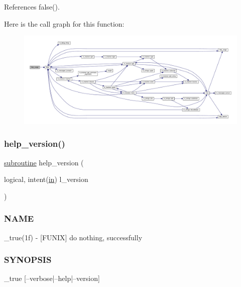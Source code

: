 References false().

Here is the call graph for this function\+:
\nopagebreak
\begin{figure}[H]
\begin{center}
\leavevmode
\includegraphics[width=350pt]{__true_8f90_a3e09a3b52ee8fb04eeb93fe5761626a8_cgraph}
\end{center}
\end{figure}
\mbox{\label{__true_8f90_a39c21619b08a3c22f19e2306efd7f766}} 
\subsubsection{\texorpdfstring{help\+\_\+version()}{help\_version()}}
{\footnotesize\ttfamily \hyperlink{M__stopwatch_83_8txt_acfbcff50169d691ff02d4a123ed70482}{subroutine} help\+\_\+version (\begin{DoxyParamCaption}\item[{logical, intent(\hyperlink{M__journal_83_8txt_afce72651d1eed785a2132bee863b2f38}{in})}]{l\+\_\+version }\end{DoxyParamCaption})}



\subsubsection*{N\+A\+ME}

\+\_\+true(1f) -\/ \mbox{[}F\+U\+N\+IX\mbox{]} do nothing, successfully 

\subsubsection*{S\+Y\+N\+O\+P\+S\+IS}

\begin{DoxyVerb}    _true [--verbose|--help|--version]
\end{DoxyVerb}


